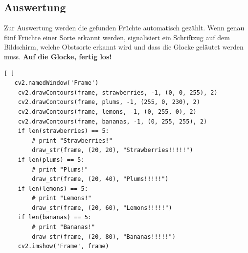 \subsection{Auswertung}

Zur Auswertung werden die gefunden Früchte automatisch gezählt. Wenn genau fünf Früchte einer Sorte erkannt werden, signalisiert ein Schriftzug auf dem Bildschirm, welche Obstsorte erkannt wird und dass die Glocke geläutet werden muss. \textbf{Auf die Glocke, fertig los!}

\lstset{language=Python}
\begin{lstlisting}[ ]
   cv2.namedWindow('Frame')
    cv2.drawContours(frame, strawberries, -1, (0, 0, 255), 2)
    cv2.drawContours(frame, plums, -1, (255, 0, 230), 2)
    cv2.drawContours(frame, lemons, -1, (0, 255, 0), 2)
    cv2.drawContours(frame, bananas, -1, (0, 255, 255), 2)
    if len(strawberries) == 5:
        # print "Strawberries!"
        draw_str(frame, (20, 20), "Strawberries!!!!!")
    if len(plums) == 5:
        # print "Plums!"
        draw_str(frame, (20, 40), "Plums!!!!!")
    if len(lemons) == 5:
        # print "Lemons!"
        draw_str(frame, (20, 60), "Lemons!!!!!")
    if len(bananas) == 5:
        # print "Bananas!"
        draw_str(frame, (20, 80), "Bananas!!!!!")
    cv2.imshow('Frame', frame)
\end{lstlisting}



